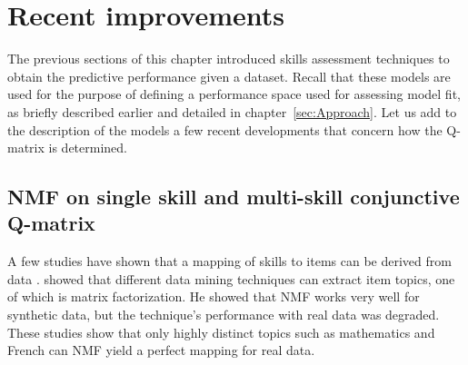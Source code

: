 \section{Recent improvements}

The previous sections of this chapter introduced skills assessment techniques to obtain the predictive performance given a dataset. Recall that these models are used for the purpose of defining a performance space used for assessing model fit, as briefly described earlier and detailed in chapter~\ref{sec:Approach}.  Let us add to the description of the models a few recent developments that concern how the Q-matrix is determined.




\subsection{NMF on single skill and multi-skill conjunctive Q-matrix}
\label{ITS2012}

A few studies have shown that a mapping of skills to items can be derived from data \citep{winters2006,desmarais2011conditions}. \citet{winters2006} showed that different data mining techniques can extract item topics, one of which is matrix factorization. He showed that NMF works very well for synthetic data, but the technique's performance with real data was degraded. These studies show that only highly distinct topics such as mathematics and French can NMF yield a perfect mapping for real data. 

